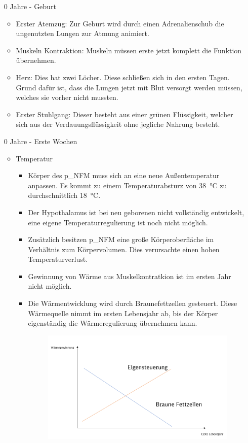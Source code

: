 \begin{itemize}
\begin{enumerate}
	\item[0 Jahre - Geburt]
	\begin{itemize}
		\item Erster Atemzug: Zur Geburt wird durch einen Adrenalienschub die ungenutzten Lungen zur Atmung animiert.
		\item Muskeln Kontraktion: Muskeln müssen erste jetzt komplett die Funktion übernehmen.
		\item Herz: Dies hat zwei Löcher. Diese schließen sich in den ersten Tagen. Grund dafür ist, dass die Lungen jetzt mit Blut versorgt werden müssen, welches sie vorher nicht mussten.
		\item Erster Stuhlgang: Dieser besteht aus einer grünen Flüssigkeit, welcher sich aus der Verdauungsflüssigkeit ohne jegliche Nahrung besteht.
	\end{itemize}
	\item[0 Jahre - Erste Wochen]
	\begin{itemize}
		\item Temperatur
		\begin{itemize}
			\item Körper des \gls{p_NFM} muss sich an eine neue Außentemperatur anpassen. Es kommt zu einem Temperaturabsturz von \SI{38}{\celsius} zu durchschnittlich \SI{18}{\celsius}.
			\item Der Hypothalamus ist bei neu geborenen nicht vollständig entwickelt, eine eigene Temperaturregulierung ist noch nicht möglich.
			\item Zusätzlich besitzen \gls{p_NFM} eine große Körperoberfläche im Verhältnis zum Körpervolumen. Dies verursachte einen hohen Temperaturverlust. 
			\item Gewinnung von Wärme aus Muskelkontratkion ist im ersten Jahr nicht möglich.
			\item Die Wärmentwicklung wird durch Braunefettzellen gesteuert. Diese Wärmequelle nimmt im ersten Lebensjahr ab, bis der Körper eigenständig die Wärmeregulierung übernehmen kann.
			\begin{figure}[H]
				\centering
				\includegraphics[scale = 0.3]{attachment/chapter_9/Scc001}

\end{figure}
\end{itemize}
\end{itemize}
\end{enumerate}
\end{itemize}
